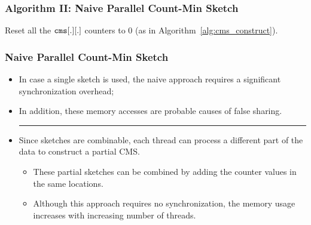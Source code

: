 \documentclass{beamer}
\begin{document}
\begin{frame}
	\frametitle{Algorithm II: Naive Parallel Count-Min Sketch}
	\begin{algorithm}[H]
		\small
		\SetAlgoNoLine
		Reset all the ${\tt cms}[.][.]$ counters to 0 (as in Algorithm~\ref{alg:cms_construct}).\\
		\label{alg:cms_construct_par_nobuf}
	\end{algorithm} 	
\end{frame}

\begin{frame}
	\frametitle{Naive Parallel Count-Min Sketch}
	\begin{itemize}
		\item In case a single sketch is used, the naive approach requires a significant synchronization overhead;
		\item In addition, these memory accesses are probable causes of false sharing.
		\vspace*{1ex}
		
		\noindent\rule{10cm}{0.4pt}

		\item Since sketches are combinable, each thread can process a different part of the data to construct a partial CMS.
		\begin{itemize}
		\item These partial sketches can be combined by adding the counter values in the same locations.
		\item Although this approach requires no synchronization, the memory usage increases with increasing number of threads.
		\end{itemize}
	\end{itemize}
\end{frame}
\end{document}
